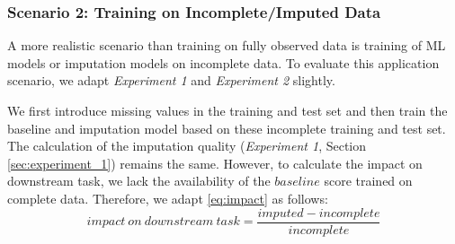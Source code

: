 \subsubsection{Scenario 2: Training on Incomplete/Imputed Data}
\label{sec:scenario_2}
%
A more realistic scenario than training on fully observed data is training of ML models or imputation models on incomplete data. To evaluate this application scenario, we adapt \emph{Experiment 1} and \emph{Experiment 2} slightly.

We first introduce missing values in the training and test set and then train the baseline and imputation model based on these incomplete training and test set. The calculation of the imputation quality (\emph{Experiment 1}, Section \ref{sec:experiment_1}) remains the same. However, to calculate the impact on downstream task, we lack the availability of the $baseline$ score trained on complete data. Therefore, we adapt \autoref{eq:impact} as follows:
%
\begin{equation}
	impact\ on \ downstream\ task = \frac{imputed - incomplete}{incomplete}
\end{equation}
%
